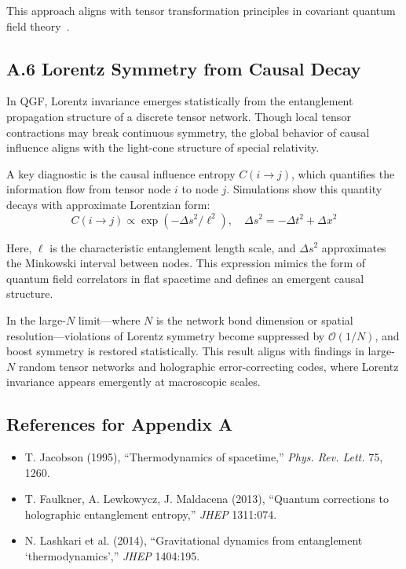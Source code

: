 \documentclass[11pt]{article}
\def\frac#1#2{#1/#2}
\def\left{}
\def\right{}
\begin{document}
This approach aligns with tensor transformation principles in covariant quantum field theory~\cite{wald1994quantum}.

\subsection*{A.6 Lorentz Symmetry from Causal Decay}

In QGF, Lorentz invariance emerges statistically from the entanglement propagation structure of a discrete tensor network. Though local tensor contractions may break continuous symmetry, the global behavior of causal influence aligns with the light-cone structure of special relativity.

A key diagnostic is the causal influence entropy $C(i \rightarrow j)$, which quantifies the information flow from tensor node $i$ to node $j$. Simulations show this quantity decays with approximate Lorentzian form:
\[
C(i \rightarrow j) \propto \exp\left( - \frac{\Delta s^2}{\ell^2} \right), \quad \Delta s^2 = -\Delta t^2 + \Delta x^2
\]

Here, $\ell$ is the characteristic entanglement length scale, and $\Delta s^2$ approximates the Minkowski interval between nodes. This expression mimics the form of quantum field correlators in flat spacetime and defines an emergent causal structure.

In the large-$N$ limit—where $N$ is the network bond dimension or spatial resolution—violations of Lorentz symmetry become suppressed by $\mathcal{O}(1/N)$, and boost symmetry is restored statistically. This result aligns with findings in large-$N$ random tensor networks and holographic error-correcting codes, where Lorentz invariance appears emergently at macroscopic scales.


\subsection*{References for Appendix A}

\begin{itemize}
    \item T. Jacobson (1995), “Thermodynamics of spacetime,” \textit{Phys. Rev. Lett.} 75, 1260.
    \item T. Faulkner, A. Lewkowycz, J. Maldacena (2013), “Quantum corrections to holographic entanglement entropy,” \textit{JHEP} 1311:074.
    \item N. Lashkari et al. (2014), “Gravitational dynamics from entanglement ‘thermodynamics’,” \textit{JHEP} 1404:195.
\end{itemize}
\end{document}
